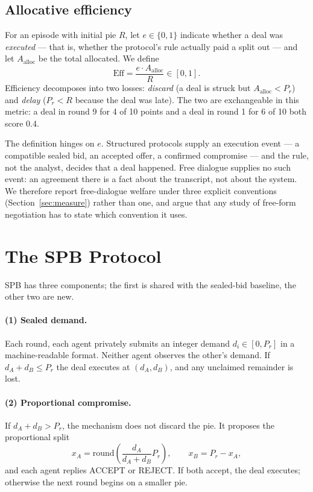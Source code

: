 \documentclass[11pt]{article}
\begin{document}
\subsection{Allocative efficiency}
\label{sec:eff}

For an episode with initial pie $R$, let $e\in\{0,1\}$ indicate whether a deal was \emph{executed} --- that is, whether the protocol's rule actually paid a split out --- and let $A_{\text{alloc}}$ be the total allocated. We define
\begin{equation}
\mathrm{Eff} = \frac{e\cdot A_{\text{alloc}}}{R}\in[0,1].
\label{eq:eff}
\end{equation}
Efficiency decomposes into two losses: \emph{discard} (a deal is struck but $A_{\text{alloc}}<P_r$) and \emph{delay} ($P_r<R$ because the deal was late). The two are exchangeable in this metric: a deal in round 9 for 4 of 10 points and a deal in round 1 for 6 of 10 both score 0.4.

The definition hinges on $e$. Structured protocols supply an execution event --- a compatible sealed bid, an accepted offer, a confirmed compromise --- and the rule, not the analyst, decides that a deal happened. Free dialogue supplies no such event: an agreement there is a fact about the transcript, not about the system. We therefore report free-dialogue welfare under three explicit conventions (Section~\ref{sec:measure}) rather than one, and argue that any study of free-form negotiation has to state which convention it uses.

\section{The SPB Protocol}
\label{sec:spb}

SPB has three components; the first is shared with the sealed-bid baseline, the other two are new.

\paragraph{(1) Sealed demand.} Each round, each agent privately submits an integer demand $d_i\in[0,P_r]$ in a machine-readable format. Neither agent observes the other's demand. If $d_A+d_B\le P_r$ the deal executes at $(d_A,d_B)$, and any unclaimed remainder is lost.

\paragraph{(2) Proportional compromise.} If $d_A+d_B>P_r$, the mechanism does not discard the pie. It proposes the proportional split
\begin{equation}
x_A=\mathrm{round}\!\left(\frac{d_A}{d_A+d_B}P_r\right),\qquad x_B=P_r-x_A,
\end{equation}
and each agent replies ACCEPT or REJECT. If both accept, the deal executes; otherwise the next round begins on a smaller pie.
\end{document}
